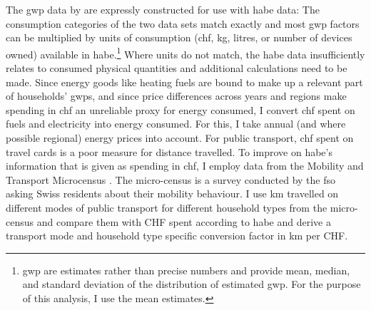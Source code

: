 \documentclass[a4paper,11pt,abstract=true]{scrartcl}
\begin{document}
The \ac{gwp} data by \citet{jakobs_nfp73_2023} are expressly constructed for use with \ac{habe} data:
The consumption categories of the two data sets match exactly and most \ac{gwp} factors can be multiplied by units of consumption (\ac{chf}, kg, litres, or number of devices owned) available in \ac{habe}.\footnote{%
  \ac{gwp} are estimates rather than precise numbers and \citet{jakobs_nfp73_2023} provide mean, median, and standard deviation of the distribution of estimated \ac{gwp}.
  For the purpose of this analysis, I use the mean estimates.
}
Where units do not match, the \ac{habe} data insufficiently relates to consumed physical quantities and additional calculations need to be made.
Since energy goods like heating fuels are bound to make up a relevant part of households' \acp{gwp}, and since price differences across years and regions make spending in \ac{chf} an unreliable proxy for energy consumed, I convert \ac{chf} spent on fuels and electricity into energy consumed.  %
For this, I take annual (and where possible regional) energy prices into account.
For public transport, \ac{chf} spent on travel cards is a poor measure for distance travelled.
To improve on \ac{habe}'s information that is given as spending in \ac{chf}, I employ data from the Mobility and Transport Microcensus \citep{biedermann_verkehrsverhalten_2017}.
The micro-census is a survey conducted by the \ac{fso} asking Swiss residents about their mobility behaviour.
I use km travelled on different modes of public transport for different household types from the micro-census and compare them with CHF spent according to \ac{habe} and derive a transport mode and household type specific conversion factor in km per CHF.

\end{document}
